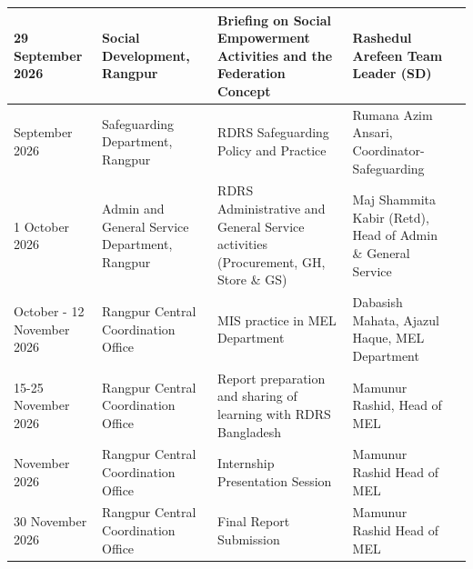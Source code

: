 \documentclass[12pt,a4paper]{report}
\begin{document}
{\begin{longtable}{|>{\raggedright\arraybackslash}p{2.0cm}|>{\raggedright\arraybackslash}p{2.4cm}|>{\raggedright\arraybackslash}p{3.75cm}|>{\raggedright\arraybackslash}p{4.15cm}|>{\raggedright\arraybackslash}p{1.9cm}|}
\rowcolor{ScheduleRow} 29 September 2026 & Social Development, Rangpur & Briefing on Social Empowerment Activities and the Federation Concept & Rashedul Arefeen \newline Team Leader (SD) \newline 01730328044 & \\ \hline
30 September 2026 & Safeguarding Department, Rangpur & RDRS Safeguarding Policy and Practice & Rumana Azim Ansari, Coordinator-Safeguarding \newline 01730328039 & \\ \hline
\rowcolor{ScheduleRow} 1 October 2026 & Admin and General Service Department, Rangpur & RDRS Administrative and General Service activities (Procurement, GH, Store \& GS) & Maj Shammita Kabir (Retd), Head of Admin \& General Service & \\ \hline
4 October - 12 November 2026 & Rangpur Central Coordination Office & MIS practice in MEL Department & Dabasish Mahata, \newline Ajazul Haque, MEL Department & \\ \hline
\rowcolor{ScheduleRow} 15-25 November 2026 & Rangpur Central Coordination Office & Report preparation and sharing of learning with RDRS Bangladesh & Mamunur Rashid, Head of MEL & \\ \hline
26 November 2026 & Rangpur Central Coordination Office & Internship Presentation Session & Mamunur Rashid \newline Head of MEL & \\ \hline
\rowcolor{ScheduleRow} 30 November 2026 & Rangpur Central Coordination Office & Final Report Submission & Mamunur Rashid \newline Head of MEL & \\ \hline
\end{longtable}
}
\end{document}
